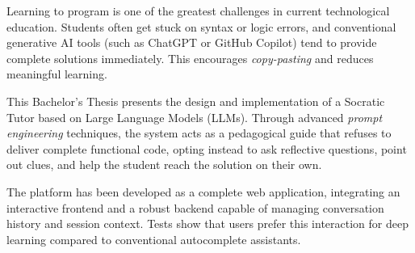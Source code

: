 Learning to program is one of the greatest challenges in current technological education. Students often get stuck on syntax or logic errors, and conventional generative AI tools (such as ChatGPT or GitHub Copilot) tend to provide complete solutions immediately. This encourages \textit{copy-pasting} and reduces meaningful learning.

This Bachelor's Thesis presents the design and implementation of a Socratic Tutor based on Large Language Models (LLMs). Through advanced \textit{prompt engineering} techniques, the system acts as a pedagogical guide that refuses to deliver complete functional code, opting instead to ask reflective questions, point out clues, and help the student reach the solution on their own.

The platform has been developed as a complete web application, integrating an interactive frontend and a robust backend capable of managing conversation history and session context. Tests show that users prefer this interaction for deep learning compared to conventional autocomplete assistants.
